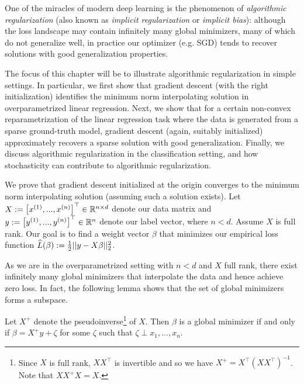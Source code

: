 \setcounter{section}{0}


One of the miracles of modern deep learning is the phenomenon of \textit{algorithmic regularization} (also known as \textit{implicit regularization} or \textit{implicit bias}): although the loss landscape may contain infinitely many global minimizers, many of which do not generalize well, in practice our optimizer (e.g. SGD) tends to recover solutions with good generalization properties.

The focus of this chapter will be to illustrate algorithmic regularization in simple settings. In particular, we first show that gradient descent (with the right initialization) identifies the minimum norm interpolating solution in overparametrized linear regression. Next, we show that for a certain non-convex reparametrization of the linear regression task where the data is generated from a sparse ground-truth model, gradient descent (again, suitably initialized) approximately recovers a sparse solution with good generalization. Finally, we discuss algorithmic regularization in the classification setting, and how stochasticity can contribute to algorithmic regularization.

\label{lec13:sec:olr}
We prove that gradient descent initialized at the origin converges to the minimum norm interpolating solution (assuming such a solution exists). Let $X:= \left[x^{(1)},...,x^{(n)} \right]^\top \in \mathbb R^{n \times d}$ denote our data matrix and $y:= \left[y^{(1)},...,y^{(n)} \right]^\top \in \mathbb R^n$ denote our label vector, where $n < d$. Assume $X$ is full rank. Our goal is to find a weight vector $\beta$ that minimizes our empirical loss function $\widehat{L} (\beta) := \frac{1}{2}||y - X\beta||_2^2$.

As we are in the overparametrized setting with $n < d$ and $X$ full rank, there exist infinitely many global minimizers that interpolate the data and hence achieve zero loss. In fact, the following lemma shows that the set of global minimizers forms a subspace.

\begin{lemma}\label{lec13:lem:soln-subspace}
Let $X^+$ denote the pseudoinverse\footnote{Since $X$ is full rank, $XX^\top$ is invertible and so we have $X^+ = X^\top (X X^\top)^{-1}$. Note that $X X^+ X = X$.} of $X$. Then $\beta$ is a global minimizer if and only if $\beta = X^+ y + \zeta$ for some $\zeta$ such that $\zeta \perp x_1,...,x_n$.
\end{lemma}

